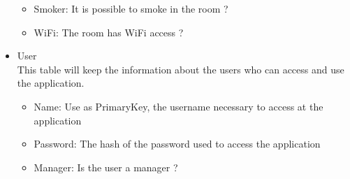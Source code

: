 \begin{itemize}
\begin{itemize}
      \item Smoker: It is possible to smoke in the room ?
      \item WiFi: The room has WiFi access ?
    \end{itemize}
  \item User \\
    This table will keep the information about the users who can access and use the application.
    \begin{itemize}
      \item Name: Use as PrimaryKey, the username necessary to access at the application
      \item Password: The hash of the password used to access the application
      \item Manager: Is the user a manager ?
    \end{itemize}
\end{itemize}



